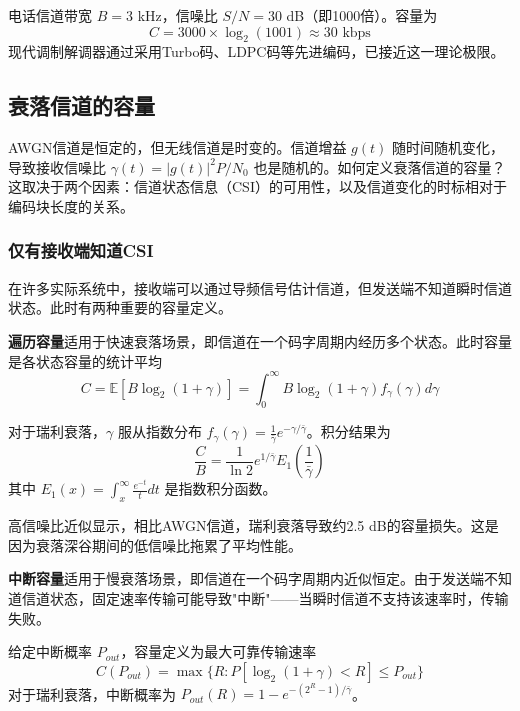 \begin{example}
电话信道带宽 $B = 3$ kHz，信噪比 $S/N = 30$ dB（即1000倍）。容量为
\begin{equation}
    C = 3000 \times \log_2(1001) \approx 30 \text{ kbps}
\end{equation}
现代调制解调器通过采用Turbo码、LDPC码等先进编码，已接近这一理论极限。
\end{example}

\subsection{衰落信道的容量}

AWGN信道是恒定的，但无线信道是时变的。信道增益 $g(t)$ 随时间随机变化，导致接收信噪比 $\gamma(t) = |g(t)|^2 P / N_0$ 也是随机的。如何定义衰落信道的容量？这取决于两个因素：信道状态信息（CSI）的可用性，以及信道变化的时标相对于编码块长度的关系。

\subsubsection{仅有接收端知道CSI}

在许多实际系统中，接收端可以通过导频信号估计信道，但发送端不知道瞬时信道状态。此时有两种重要的容量定义。

\textbf{遍历容量}适用于快速衰落场景，即信道在一个码字周期内经历多个状态。此时容量是各状态容量的统计平均
\begin{equation}
    C = \mathbb{E}\left[B \log_2(1 + \gamma)\right] = \int_0^\infty B \log_2(1 + \gamma) f_\gamma(\gamma) d\gamma
\end{equation}

对于瑞利衰落，$\gamma$ 服从指数分布 $f_\gamma(\gamma) = \frac{1}{\bar{\gamma}} e^{-\gamma/\bar{\gamma}}$。积分结果为
\begin{equation}
    \frac{C}{B} = \frac{1}{\ln 2} e^{1/\bar{\gamma}} E_1\left(\frac{1}{\bar{\gamma}}\right)
\end{equation}
其中 $E_1(x) = \int_x^\infty \frac{e^{-t}}{t} dt$ 是指数积分函数。

高信噪比近似显示，相比AWGN信道，瑞利衰落导致约2.5 dB的容量损失。这是因为衰落深谷期间的低信噪比拖累了平均性能。

\textbf{中断容量}适用于慢衰落场景，即信道在一个码字周期内近似恒定。由于发送端不知道信道状态，固定速率传输可能导致"中断"——当瞬时信道不支持该速率时，传输失败。

给定中断概率 $P_{out}$，容量定义为最大可靠传输速率
\begin{equation}
    C(P_{out}) = \max\{R: P[\log_2(1+\gamma) < R] \leq P_{out}\}
\end{equation}
对于瑞利衰落，中断概率为 $P_{out}(R) = 1 - e^{-(2^R-1)/\bar{\gamma}}$。


